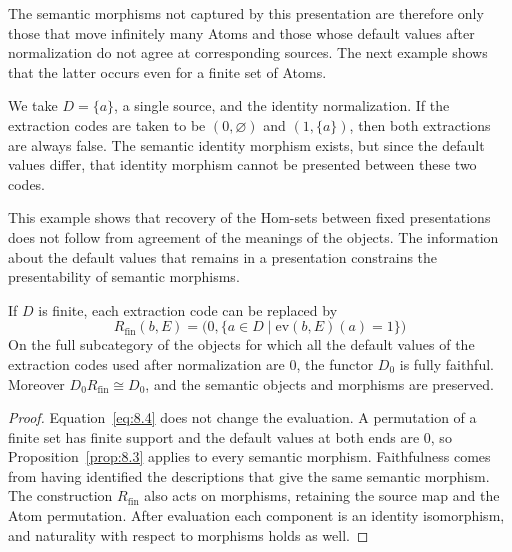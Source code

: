 The semantic morphisms not captured by this presentation are therefore only those that move
infinitely many Atoms and those whose default values after normalization do not agree at
corresponding sources.
The next example shows that the latter occurs even for a finite set of Atoms.

\begin{example}\label{ex:8.4}

We take $D=\{a\}$, a single source, and the identity normalization.
If the extraction codes are taken to be $(0,\varnothing)$ and $(1,\{a\})$, then both
extractions are always false.
The semantic identity morphism exists, but since the default values differ, that identity
morphism cannot be presented between these two codes.

This example shows that recovery of the Hom-sets between fixed presentations does not follow
from agreement of the meanings of the objects.
The information about the default values that remains in a presentation constrains the
presentability of semantic morphisms.

\end{example}

\begin{corollary}\label{cor:8.5}

If $D$ is finite, each extraction code can be replaced by
\begin{equation*}
R_{\mathrm{fin}}(b,E)
=
\bigl(0,\{a\in D\mid\mathrm{ev}(b,E)(a)=1\}\bigr)
\tag{8.4}\label{eq:8.4}
\end{equation*}
On the full subcategory of the objects for which all the default values of the extraction
codes used after normalization are 0, the functor $D_0$ is fully faithful.
Moreover $D_0R_{\mathrm{fin}}\cong D_0$, and the semantic objects and morphisms are
preserved.

\end{corollary}

\begin{proof}

Equation~\eqref{eq:8.4} does not change the evaluation.
A permutation of a finite set has finite support and the default values at both ends are 0,
so Proposition~\ref{prop:8.3} applies to every semantic morphism.
Faithfulness comes from having identified the descriptions that give the same semantic
morphism.
The construction $R_{\mathrm{fin}}$ also acts on morphisms, retaining the source map and the
Atom permutation.
After evaluation each component is an identity isomorphism, and naturality with respect to
morphisms holds as well.

\end{proof}

